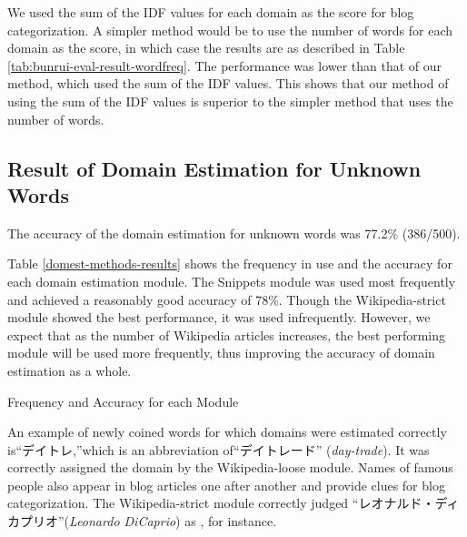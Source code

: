 \documentclass[english]{jnlp_1.4_rep}
\newcommand{\dom}[1]{}
\begin{document}
\begin{table}[t]
\setlength{\captionwidth}{205pt}
\begin{minipage}{205pt}
\label{tab:bunrui-eval-result-autodic}

\end{minipage}
\hfill
\begin{minipage}{205pt}
\label{tab:bunrui-eval-result-wordfreq}

\end{minipage}
\end{table}

We used the sum of the IDF values for each domain as the score for blog
categorization. 
A simpler method would be to use the number of words for each domain
as the score, in which case the results are as described in Table
\ref{tab:bunrui-eval-result-wordfreq}.
The performance was lower than that of our method, which used the sum of
the IDF values.
This shows that our method of using the sum of the IDF values is superior
to the simpler method that uses the number of words.


\subsection{Result of Domain Estimation for Unknown Words}

The accuracy of the domain estimation for unknown words was
77.2\% (386/500).

Table \ref{domest-methods-results} shows the frequency in use and
the accuracy for each domain estimation module.
The Snippets module was used most frequently and achieved a reasonably
good accuracy of 78\%.
Though the Wikipedia-strict module showed the best performance, it was
used infrequently.
However, we expect that as the number of Wikipedia articles increases,
the best performing module will be used more frequently, thus
improving the accuracy of domain estimation as a whole.

\begin{table}[b]
\caption{Frequency and Accuracy for each Module}
\label{domest-methods-results}

\end{table}

An example of newly coined words for which domains were estimated correctly
is“デイトレ,”which is an abbreviation of“デイトレード”
(\textit{day-trade}). 
It was correctly assigned the \dom{business} domain by the Wikipedia-loose
module.
Names of famous people also appear in blog articles one after another
and provide clues for blog categorization.
The Wikipedia-strict module correctly judged 
“レオナルド・ディカプリオ”(\textit{Leonardo DiCaprio})
as 
\dom{culture}, for instance.
\end{document}
